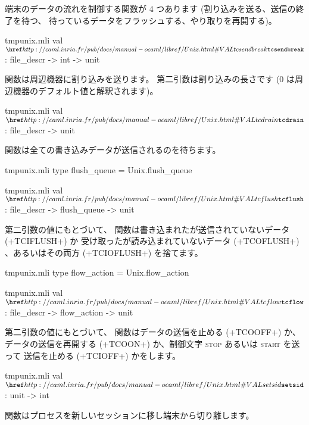 端末のデータの流れを制御する関数が 4 つあります (割り込みを送る、送信の終了を待つ、
待っているデータをフラッシュする、やり取りを再開する)。
%
\begin{listingcodefile}{tmpunix.mli}
val $\libvalue{Unix}{tcsendbreak}$ : file_descr -> int -> unit
\end{listingcodefile}
%
 関数は周辺機器に割り込みを送ります。
第二引数は割り込みの長さです (0 は周辺機器のデフォルト値と解釈されます)。
%
\begin{listingcodefile}{tmpunix.mli}
val $\libvalue{Unix}{tcdrain}$ : file_descr -> unit
\end{listingcodefile}
%
 関数は全ての書き込みデータが送信されるのを待ちます。
%
\begin{codefile}{tmpunix.mli}
type flush_queue = Unix.flush_queue
\end{codefile}
%
\begin{listingcodefile}{tmpunix.mli}
val $\libvalue{Unix}{tcflush}$ : file_descr -> flush_queue -> unit
\end{listingcodefile}
%
第二引数の値にもとづいて、  関数は書き込まれたが送信されていないデータ (\ml+TCIFLUSH+) か
受け取ったが読み込まれていないデータ (\ml+TCOFLUSH+) 、あるいはその両方 (\ml+TCIOFLUSH+) を捨てます。
%
\begin{codefile}{tmpunix.mli}
type flow_action = Unix.flow_action
\end{codefile}
%
\begin{listingcodefile}{tmpunix.mli}
val $\libvalue{Unix}{tcflow}$ : file_descr -> flow_action -> unit
\end{listingcodefile}
%
第二引数の値にもとづいて、  関数はデータの送信を止める (\ml+TCOOFF+) か、
データの送信を再開する (\ml+TCOON+) か、制御文字 \textsc{stop} あるいは \textsc{start} を送って
送信を止める (\ml+TCIOFF+) かをします。
%
\begin{listingcodefile}{tmpunix.mli}
val $\libvalue{Unix}{setsid}$ : unit -> int
\end{listingcodefile}
%
 関数はプロセスを新しいセッションに移し端末から切り離します。

